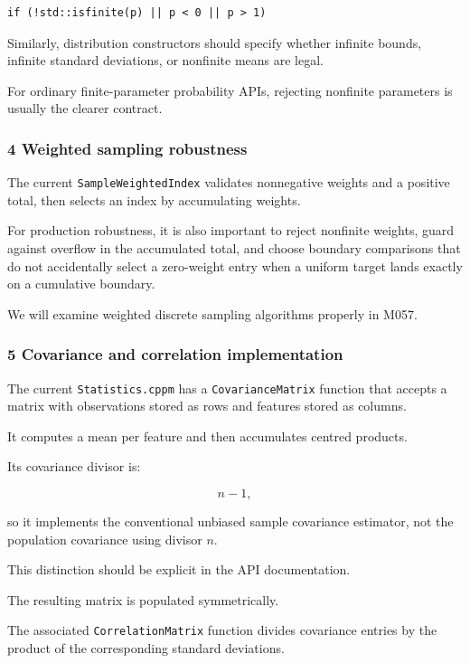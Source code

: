\begin{verbatim}
if (!std::isfinite(p) || p < 0 || p > 1)
\end{verbatim}

Similarly, distribution constructors should specify whether infinite bounds, infinite standard deviations, or nonfinite means are legal.

For ordinary finite-parameter probability APIs, rejecting nonfinite parameters is usually the clearer contract.

\subsubsection{4 Weighted sampling robustness}\label{02-foundations-ii-ch039-weighted-sampling-robustness}

The current \texttt{SampleWeightedIndex} validates nonnegative weights and a positive total, then selects an index by accumulating weights.

For production robustness, it is also important to reject nonfinite weights, guard against overflow in the accumulated total, and choose boundary comparisons that do not accidentally select a zero-weight entry when a uniform target lands exactly on a cumulative boundary.

We will examine weighted discrete sampling algorithms properly in M057.

\subsubsection{5 Covariance and correlation implementation}\label{02-foundations-ii-ch039-covariance-and-correlation-implementation}

The current \texttt{Statistics.cppm} has a \texttt{CovarianceMatrix} function that accepts a matrix with observations stored as rows and features stored as columns.

It computes a mean per feature and then accumulates centred products.

Its covariance divisor is:

\[
 n-1,
\]

so it implements the conventional unbiased sample covariance estimator, not the population covariance using divisor \(n\).

This distinction should be explicit in the API documentation.

The resulting matrix is populated symmetrically.

The associated \texttt{CorrelationMatrix} function divides covariance entries by the product of the corresponding standard deviations.

